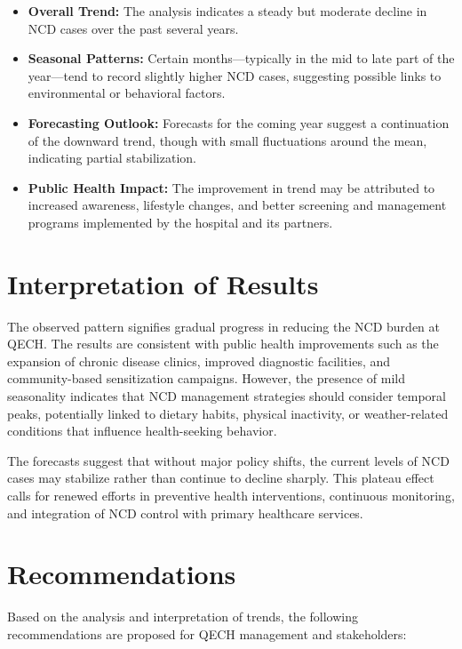 \documentclass[12pt,a4paper]{report}
\begin{document}
\begin{itemize}
    \item \textbf{Overall Trend:} The analysis indicates a steady but moderate decline in NCD cases over the past several years.
    \item \textbf{Seasonal Patterns:} Certain months—typically in the mid to late part of the year—tend to record slightly higher NCD cases, suggesting possible links to environmental or behavioral factors.
    \item \textbf{Forecasting Outlook:} Forecasts for the coming year suggest a continuation of the downward trend, though with small fluctuations around the mean, indicating partial stabilization.
    \item \textbf{Public Health Impact:} The improvement in trend may be attributed to increased awareness, lifestyle changes, and better screening and management programs implemented by the hospital and its partners.
\end{itemize}

\chapter*{Interpretation of Results}

\noindent
The observed pattern signifies gradual progress in reducing the NCD burden at QECH. The results are consistent with public health improvements such as the expansion of chronic disease clinics, improved diagnostic facilities, and community-based sensitization campaigns. However, the presence of mild seasonality indicates that NCD management strategies should consider temporal peaks, potentially linked to dietary habits, physical inactivity, or weather-related conditions that influence health-seeking behavior.

\noindent The forecasts suggest that without major policy shifts, the current levels of NCD cases may stabilize rather than continue to decline sharply. This plateau effect calls for renewed efforts in preventive health interventions, continuous monitoring, and integration of NCD control with primary healthcare services.

\chapter*{Recommendations}

\noindent
Based on the analysis and interpretation of trends, the following recommendations are proposed for QECH management and stakeholders:
\end{document}
